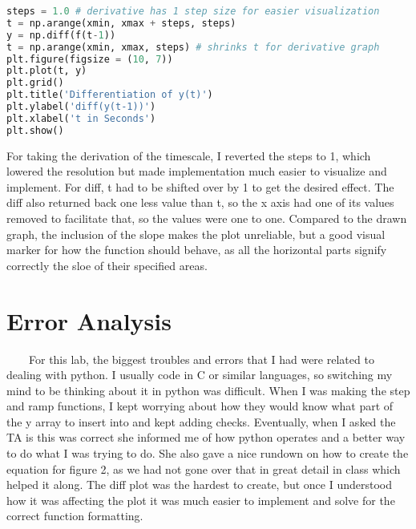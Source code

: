 \documentclass[11pt,a4]{article}
\begin{document}
\begin{lstlisting}[language=Python]
steps = 1.0 # derivative has 1 step size for easier visualization
t = np.arange(xmin, xmax + steps, steps)
y = np.diff(f(t-1))
t = np.arange(xmin, xmax, steps) # shrinks t for derivative graph
plt.figure(figsize = (10, 7))
plt.plot(t, y)
plt.grid()
plt.title('Differentiation of y(t)')
plt.ylabel('diff(y(t-1))')
plt.xlabel('t in Seconds')
plt.show()
\end{lstlisting}

For taking the derivation of the timescale, I reverted the steps to 1, which lowered the resolution but made implementation much easier to visualize and implement. For diff, t had to be shifted over by 1 to get the desired effect. The diff also returned back one less value than t, so the x axis had one of its values removed to facilitate that, so the values were one to one. Compared to the drawn graph, the inclusion of the slope makes the plot unreliable, but a good visual marker for how the function should behave, as all the horizontal parts signify correctly the sloe of their specified areas.

\section{Error Analysis}
\ \ \ \ For this lab, the biggest troubles and errors that I had were related to dealing with python. I usually code in C or similar languages, so switching my mind to be thinking about it in python was difficult. When I was making the step and ramp functions, I kept worrying about how they would know what part of the y array to insert into and kept adding checks. Eventually, when I asked the TA is this was correct she informed me of how python operates and a better way to do what I was trying to do. She also gave a nice rundown on how to create the equation for figure 2, as we had not gone over that in great detail in class which helped it along. The diff plot was the hardest to create, but once I understood how it was affecting the plot it was much easier to implement and solve for the correct function formatting.
\end{document}
